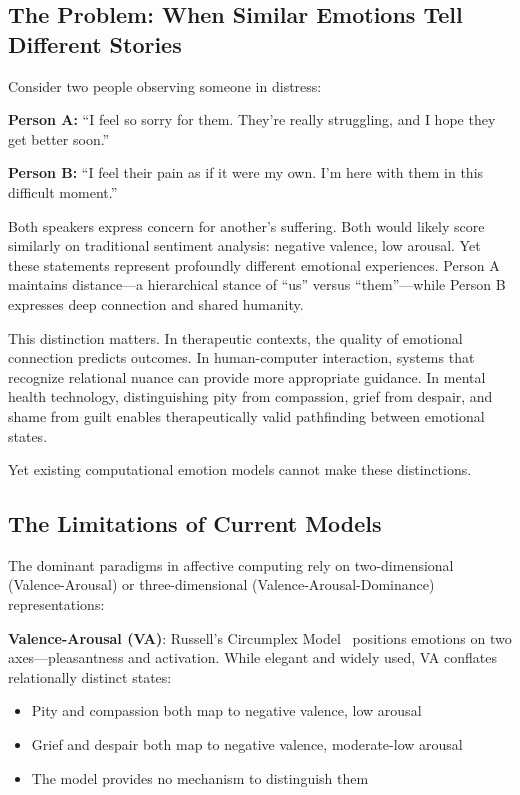 \subsection{The Problem: When Similar Emotions Tell Different Stories}

Consider two people observing someone in distress:

\textbf{Person A:} ``I feel so sorry for them. They're really struggling, and I hope they get better soon.''

\textbf{Person B:} ``I feel their pain as if it were my own. I'm here with them in this difficult moment.''

Both speakers express concern for another's suffering. Both would likely score similarly on traditional sentiment analysis: negative valence, low arousal. Yet these statements represent profoundly different emotional experiences. Person A maintains distance—a hierarchical stance of ``us'' versus ``them''—while Person B expresses deep connection and shared humanity.

This distinction matters. In therapeutic contexts, the quality of emotional connection predicts outcomes. In human-computer interaction, systems that recognize relational nuance can provide more appropriate guidance. In mental health technology, distinguishing pity from compassion, grief from despair, and shame from guilt enables therapeutically valid pathfinding between emotional states.

Yet existing computational emotion models cannot make these distinctions.

\subsection{The Limitations of Current Models}

The dominant paradigms in affective computing rely on two-dimensional (Valence-Arousal) or three-dimensional (Valence-Arousal-Dominance) representations:

\textbf{Valence-Arousal (VA)}: Russell's Circumplex Model~\cite{russell1980} positions emotions on two axes—pleasantness and activation. While elegant and widely used, VA conflates relationally distinct states:
\begin{itemize}
    \item Pity and compassion both map to negative valence, low arousal
    \item Grief and despair both map to negative valence, moderate-low arousal
    \item The model provides no mechanism to distinguish them
\end{itemize}

